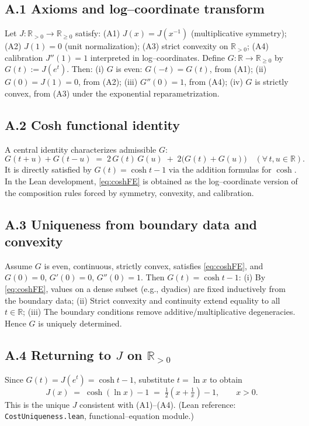 \documentclass[12pt,a4paper]{article}
\begin{document}
\subsection*{A.1 Axioms and log–coordinate transform}
Let $J:\mathbb{R}_{>0}\to\mathbb{R}_{\ge 0}$ satisfy:
(A1) $J(x)=J(x^{-1})$ (multiplicative symmetry);
(A2) $J(1)=0$ (unit normalization);
(A3) strict convexity on $\mathbb{R}_{>0}$;
(A4) calibration $J''(1)=1$ interpreted in log–coordinates.
Define $G:\mathbb{R}\to\mathbb{R}_{\ge 0}$ by $G(t):=J(e^t)$. Then:
(i) $G$ is even: $G(-t)=G(t)$, from (A1);
(ii) $G(0)=J(1)=0$, from (A2);
(iii) $G''(0)=1$, from (A4);
(iv) $G$ is strictly convex, from (A3) under the exponential reparametrization.

\subsection*{A.2 Cosh functional identity}
A central identity characterizes admissible $G$:
\begin{equation}\label{eq:coshFE}
  G(t+u)+G(t-u)\;=\;2\,G(t)\,G(u)\;+\;2\big(G(t)+G(u)\big)\quad(\forall\,t,u\in\mathbb{R}).
\end{equation}
It is directly satisfied by $G(t)=\cosh t-1$ via the addition formulas for $\cosh$. In the Lean development, \eqref{eq:coshFE} is obtained as the log–coordinate version of the composition rules forced by symmetry, convexity, and calibration.

\subsection*{A.3 Uniqueness from boundary data and convexity}
Assume $G$ is even, continuous, strictly convex, satisfies \eqref{eq:coshFE}, and $G(0)=0$, $G'(0)=0$, $G''(0)=1$. Then $G(t)=\cosh t-1$:
(i) By \eqref{eq:coshFE}, values on a dense subset (e.g., dyadics) are fixed inductively from the boundary data;
(ii) Strict convexity and continuity extend equality to all $t\in\mathbb{R}$;
(iii) The boundary conditions remove additive/multiplicative degeneracies.
Hence $G$ is uniquely determined.

\subsection*{A.4 Returning to $J$ on $\mathbb{R}_{>0}$}
Since $G(t)=J(e^t)=\cosh t-1$, substitute $t=\ln x$ to obtain
\[
  J(x)\;=\;\cosh(\ln x)-1
  \;=\;\tfrac{1}{2}\!\left(x+\tfrac{1}{x}\right)-1,\qquad x>0.
\]
This is the unique $J$ consistent with (A1)–(A4). (Lean reference: \texttt{CostUniqueness.lean}, functional–equation module.)
\end{document}
